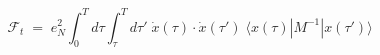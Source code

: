 \begin{equation}\label{eq:eff2}
 {\mathcal F}_t\;=\; e_N^2 \int_0^T d\tau \int_\tau^T d\tau' \; 
{\dot x}(\tau) \cdot {\dot x}(\tau') \; 
\langle x(\tau) | M^{-1} | x(\tau') \rangle
\end{equation}

